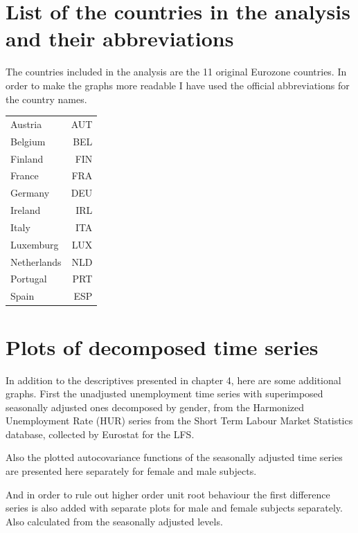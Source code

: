 \documentclass[12pt,a4paper,english]{article}
\begin{document}
\begin{appendices}


\section{List of the countries in the analysis and their abbreviations }\label{countries}

The countries included in the analysis are the 11 original Eurozone countries. In order to make the graphs more readable I have used the official abbreviations for the country names.

\begin{tabular}{l r}
Austria & AUT \\
Belgium & BEL \\
Finland & FIN \\
France & FRA \\
Germany & DEU \\
Ireland & IRL \\
Italy & ITA \\
Luxemburg & LUX \\
Netherlands & NLD \\
Portugal & PRT \\
Spain & ESP \\
\end{tabular}

\section{Plots of decomposed time series}\label{extradescriptives}

In addition to the descriptives presented in chapter 4, here are some additional graphs. First the unadjusted unemployment time series with superimposed seasonally adjusted ones decomposed by gender, from the Harmonized Unemployment Rate (HUR) series from the Short Term Labour Market Statistics database, collected by Eurostat for the LFS.

Also the plotted autocovariance functions of the seasonally adjusted time series are presented here separately for female and male subjects.

And in order to rule out higher order unit root behaviour the first difference series is also added with separate plots for male and female subjects separately. Also calculated from the seasonally adjusted levels. 


\begin{figure}[H]


\end{figure}
\end{appendices}
\end{document}
